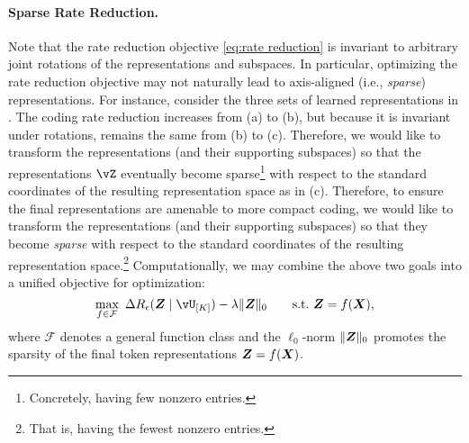 \documentclass[\toplevelprefix/book-main.tex]{subfiles}
\begin{document}
\paragraph{Sparse Rate Reduction.} Note that the rate reduction objective \eqref{eq:rate reduction} is invariant to arbitrary joint rotations of the representations and subspaces. In particular, optimizing the rate reduction objective may not naturally lead to axis-aligned (i.e., \textit{sparse}) representations. {For instance, consider the three sets of learned representations in . The coding rate reduction increases from (a) to (b), but because it is invariant under rotations, remains the same from (b) to (c).} Therefore, we would like to transform the representations (and their supporting subspaces) so that the representations $\vZ$ eventually become sparse\footnote{Concretely, having few nonzero entries.} with respect to the standard coordinates of the resulting representation space {as in (c)}. Therefore, to ensure the final representations are amenable to more compact coding, we would like to transform the representations (and their supporting subspaces) so that they become \textit{sparse} with respect to the standard coordinates of the resulting representation space.\footnote{That is, having the fewest nonzero entries.} Computationally, we may combine the above two goals into a unified objective for optimization:
\begin{equation}
   \max_{f \in \mathcal{F}}\ \Delta R_{\epsilon}(\Z \mid \vU_{[K]}) - \lambda \|\bm{Z}\|_0 \qquad \text{s.t.}\ \Z = f(\X),
   \label{eq:sparse-rr}
\end{equation}
where $\mathcal{F}$ denotes a general function class and the $\ell_0$-norm $\|\bm{Z}\|_0$ promotes the sparsity of the final token representations \(\bm{Z} = f(\bm{X})\).%
\end{document}
